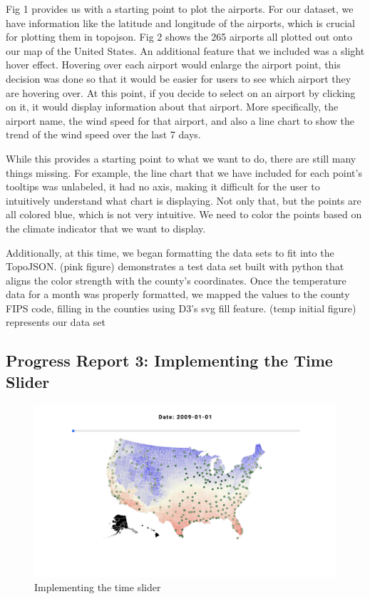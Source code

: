 \documentclass[9pt,twocolumn,twoside]{opticajnl}
\begin{document}
Fig 1 provides us with a starting point to plot the airports. For our dataset, we have information like the latitude and longitude of the airports, which is crucial for plotting them in topojson. Fig 2 shows the 265 airports all plotted out onto our map of the United States. An additional feature that we included was a slight hover effect. Hovering over each airport would enlarge the airport point, this decision was done so that it would be easier for users to see which airport they are hovering over. At this point, if you decide to select on an airport by clicking on it, it would display information about that airport. More specifically, the airport name, the wind speed for that airport, and also a line chart to show the trend of the wind speed over the last 7 days.

While this provides a starting point to what we want to do, there are still many things missing. For example, the line chart that we have included for each point's tooltips was unlabeled, it had no axis, making it difficult for the user to intuitively understand what chart is displaying. Not only that, but the points are all colored blue, which is not very intuitive. We need to color the points based on the climate indicator that we want to display.

Additionally, at this time, we began formatting the data sets to fit into the TopoJSON. (pink figure) demonstrates a test data set built with python that aligns the color strength with the county's coordinates. Once the temperature data for a month was properly formatted, we mapped the values to the county FIPS code, filling in the counties using D3's svg fill feature. (temp initial figure) represents our data set

\subsection {Progress Report 3: Implementing the Time Slider}

\begin{figure}
    \centering
    \includegraphics[scale=0.10]{images/img3.png}
    \caption{Implementing the time slider}
\end{figure}
\end{document}
